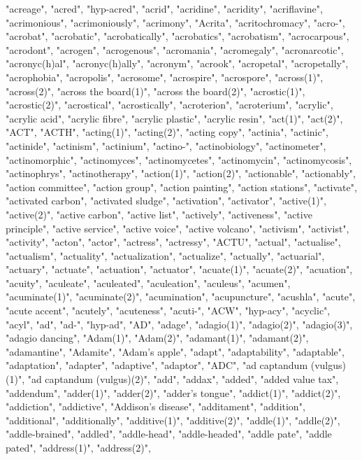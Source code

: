 "acreage",
"acred",
"hyp-acred",
"acrid",
"acridine",
"acridity",
"acriflavine",
"acrimonious",
"acrimoniously",
"acrimony",
"Acrita",
"acritochromacy",
"acro-",
"acrobat",
"acrobatic",
"acrobatically",
"acrobatics",
"acrobatism",
"acrocarpous",
"acrodont",
"acrogen",
"acrogenous",
"acromania",
"acromegaly",
"acronarcotic",
"acronyc(h)al",
"acronyc(h)ally",
"acronym",
"acrook",
"acropetal",
"acropetally",
"acrophobia",
"acropolis",
"acrosome",
"acrospire",
"acrospore",
"across(1)",
"across(2)",
"across the board(1)",
"across the board(2)",
"acrostic(1)",
"acrostic(2)",
"acrostical",
"acrostically",
"acroterion",
"acroterium",
"acrylic",
"acrylic acid",
"acrylic fibre",
"acrylic plastic",
"acrylic resin",
"act(1)",
"act(2)",
"ACT",
"ACTH",
"acting(1)",
"acting(2)",
"acting copy",
"actinia",
"actinic",
"actinide",
"actinism",
"actinium",
"actino-",
"actinobiology",
"actinometer",
"actinomorphic",
"actinomyces",
"actinomycetes",
"actinomycin",
"actinomycosis",
"actinophrys",
"actinotherapy",
"action(1)",
"action(2)",
"actionable",
"actionably",
"action committee",
"action group",
"action painting",
"action stations",
"activate",
"activated carbon",
"activated sludge",
"activation",
"activator",
"active(1)",
"active(2)",
"active carbon",
"active list",
"actively",
"activeness",
"active principle",
"active service",
"active voice",
"active volcano",
"activism",
"activist",
"activity",
"acton",
"actor",
"actress",
"actressy",
"ACTU",
"actual",
"actualise",
"actualism",
"actuality",
"actualization",
"actualize",
"actually",
"actuarial",
"actuary",
"actuate",
"actuation",
"actuator",
"acuate(1)",
"acuate(2)",
"acuation",
"acuity",
"aculeate",
"aculeated",
"aculeation",
"aculeus",
"acumen",
"acuminate(1)",
"acuminate(2)",
"acumination",
"acupuncture",
"acushla",
"acute",
"acute accent",
"acutely",
"acuteness",
"acuti-",
"ACW",
"hyp-acy",
"acyclic",
"acyl",
"ad",
"ad-",
"hyp-ad",
"AD",
"adage",
"adagio(1)",
"adagio(2)",
"adagio(3)",
"adagio dancing",
"Adam(1)",
"Adam(2)",
"adamant(1)",
"adamant(2)",
"adamantine",
"Adamite",
"Adam's apple",
"adapt",
"adaptability",
"adaptable",
"adaptation",
"adapter",
"adaptive",
"adaptor",
"ADC",
"ad captandum (vulgus)(1)",
"ad captandum (vulgus)(2)",
"add",
"addax",
"added",
"added value tax",
"addendum",
"adder(1)",
"adder(2)",
"adder's tongue",
"addict(1)",
"addict(2)",
"addiction",
"addictive",
"Addison's disease",
"additament",
"addition",
"additional",
"additionally",
"additive(1)",
"additive(2)",
"addle(1)",
"addle(2)",
"addle-brained",
"addled",
"addle-head",
"addle-headed",
"addle pate",
"addle pated",
"address(1)",
"address(2)",
